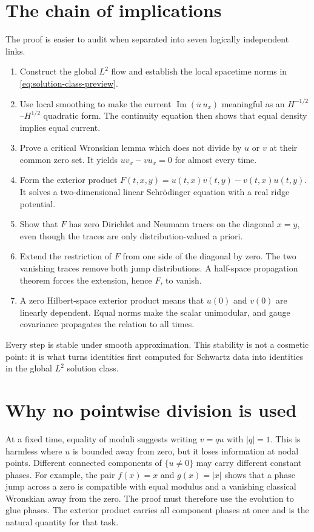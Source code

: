 \documentclass[11pt,oneside]{book}
\theoremstyle{definition}
\theoremstyle{remark}
\newcommand{\1}{\mathbf 1}
\newcommand{\Ima}{\operatorname{Im}}
\begin{document}
\section{The chain of implications}
The proof is easier to audit when separated into seven logically independent
links.

\begin{enumerate}[label=\textbf{Step \arabic*.},leftmargin=5.2em]
\item Construct the global $L^2$ flow and establish the local spacetime norms
      in \eqref{eq:solution-class-preview}.
\item Use local smoothing to make the current
      $\Ima(\overline u\,u_x)$ meaningful as an $H^{-1/2}$--$H^{1/2}$
      quadratic form.  The continuity equation then shows that equal density
      implies equal current.
\item Prove a critical Wronskian lemma which does not divide by $u$ or $v$ at
      their common zero set.  It yields
      $uv_x-vu_x=0$ for almost every time.
\item Form the exterior product
      $F(t,x,y)=u(t,x)v(t,y)-v(t,x)u(t,y)$.  It solves a two-dimensional
      linear Schr\"odinger equation with a real ridge potential.
\item Show that $F$ has zero Dirichlet and Neumann traces on the diagonal
      $x=y$, even though the traces are only distribution-valued a priori.
\item Extend the restriction of $F$ from one side of the diagonal by zero.
      The two vanishing traces remove both jump distributions.  A
      half-space propagation theorem forces the extension, hence $F$, to
      vanish.
\item A zero Hilbert-space exterior product means that $u(0)$ and $v(0)$ are
      linearly dependent.  Equal norms make the scalar unimodular, and gauge
      covariance propagates the relation to all times.
\end{enumerate}

Every step is stable under smooth approximation.  This stability is not a
cosmetic point: it is what turns identities first computed for Schwartz data
into identities in the global $L^2$ solution class.

\section{Why no pointwise division is used}
At a fixed time, equality of moduli suggests writing $v=q u$ with $|q|=1$.
This is harmless where $u$ is bounded away from zero, but it loses information
at nodal points.  Different connected components of $\{u\ne0\}$ may carry
different constant phases.  For example, the pair $f(x)=x$ and $g(x)=|x|$
shows that a phase jump across a zero is compatible with equal modulus and a
vanishing classical Wronskian away from the zero.  The proof must therefore
use the evolution to glue phases.  The exterior product carries all component
phases at once and is the natural quantity for that task.
\end{document}

